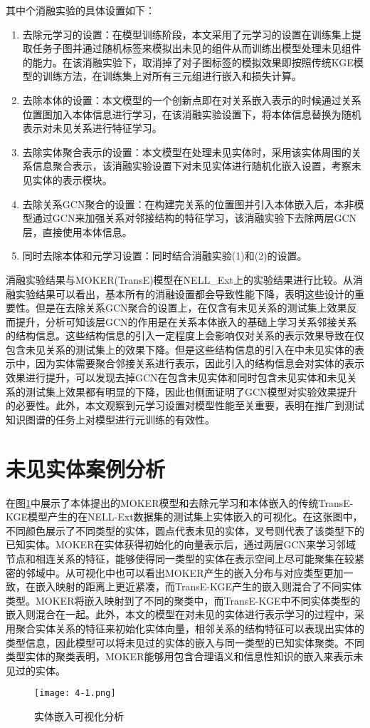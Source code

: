其中个消融实验的具体设置如下：
\begin{enumerate}[label=\arabic*)]
  \item 去除元学习的设置：在模型训练阶段，本文采用了元学习的设置在训练集上提取任务子图并通过随机标签来模拟出未见的组件从而训练出模型处理未见组件的能力。在该消融实验下，取消掉了对子图标签的模拟效果即按照传统KGE模型的训练方法，在训练集上对所有三元组进行嵌入和损失计算。
  \item 去除本体的设置：本文模型的一个创新点即在对关系嵌入表示的时候通过关系位置图加入本体信息进行学习，在该消融实验设置下，将本体信息替换为随机表示对未见关系进行特征学习。
  \item 去除实体聚合表示的设置：本文模型在处理未见实体时，采用该实体周围的关系信息聚合表示，该消融实验设置下对未见实体进行随机化嵌入设置，考察未见实体的表示模块。
  \item 去除关系GCN聚合的设置：在构建完关系的位置图并引入本体嵌入后，本非模型通过GCN来加强关系对邻接结构的特征学习，该消融实验下去除两层GCN层，直接使用本体信息。
  \item 同时去除本体和元学习设置：同时结合消融实验(1)和(2)的设置。
\end{enumerate}

消融实验结果与MOKER(TransE)模型在NELL\_Ext上的实验结果进行比较。从消融实验结果可以看出，基本所有的消融设置都会导致性能下降，表明这些设计的重要性。但是在去除关系GCN聚合的设置上，在仅含有未见关系的测试集上效果反而提升，分析可知该层GCN的作用是在关系本体嵌入的基础上学习关系邻接关系的结构信息。这些结构信息的引入一定程度上会影响仅对关系的表示效果导致在仅包含未见关系的测试集上的效果下降。但是这些结构信息的引入在中未见实体的表示中，因为实体需要聚合邻接关系进行表示，因此引入的结构信息会对实体的表示效果进行提升，可以发现去掉GCN在包含未见实体和同时包含未见实体和未见关系的测试集上效果都有明显的下降，因此也侧面证明了GCN模型对实验效果提升的必要性。此外，本文观察到元学习设置对模型性能至关重要，表明在推广到测试知识图谱的任务上对模型进行元训练的有效性。

\section{未见实体案例分析}
在图\ref{fig:4-1}中展示了本体提出的MOKER模型和去除元学习和本体嵌入的传统TransE-KGE模型产生的在NELL-Ext数据集的测试集上实体嵌入的可视化。在这张图中，不同颜色展示了不同类型的实体，圆点代表未见的实体，叉号则代表了该类型下的已知实体。MOKER在实体获得初始化的向量表示后，通过两层GCN来学习邻域节点和相连关系的特征，能够使得同一类型的实体在表示空间上尽可能聚集在较紧密的邻域中。从可视化中也可以看出MOKER产生的嵌入分布与对应类型更加一致，在嵌入映射的距离上更近紧凑，而TransE-KGE产生的嵌入则混合了不同实体类型。MOKER将嵌入映射到了不同的聚类中，而TransE-KGE中不同实体类型的嵌入则混合在一起。此外，本文的模型在对未见的实体进行表示学习的过程中，采用聚合实体关系的特征来初始化实体向量，相邻关系的结构特征可以表现出实体的类型信息，因此模型可以将未见过的实体的嵌入与同一类型的已知实体聚类。不同类型实体的聚类表明，MOKER能够用包含合理语义和信息性知识的嵌入来表示未见过的实体。
\begin{figure}[h]
  \centering
  \texttt{[image: 4-1.png]}
  \caption{实体嵌入可视化分析}
  \label{fig:4-1}
\end{figure}


